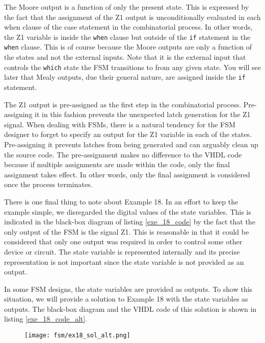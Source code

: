 \begin{my_list}
\item The Moore output is a function of only the present state. This is expressed by the fact that the assignment of the Z1 output is unconditionally evaluated in each when clause of the case statement in the combinatorial process. In other words, the Z1 variable is inside the \texttt{when} clause but outside of the \texttt{if} statement in the \texttt{when} clause. This is of course because the Moore outputs are only a function of the states and not the external inputs. Note that it is the external input that controls the \texttt{which} state the FSM transitions to from any given state. You will see later that Mealy outputs, due their general nature, are assigned inside the \texttt{if} statement.

\item The Z1 output is pre-assigned as the first step in the combinatorial process. Pre-assigning it in this fashion prevents the unexpected latch generation for the Z1 signal. When dealing with FSMs, there is a natural tendency for the FSM designer to forget to specify an output for the Z1 variable in each of the states. Pre-assigning it prevents latches from being generated and can arguably clean up the source code. The pre-assignment makes no difference to the VHDL code because if multiple assignments are made within the code, only the final assignment takes effect. In other words, only the final assignment is considered once the process terminates. 
\end{my_list}

There is one final thing to note about Example 18. In an effort to keep the example simple, we disregarded the digital values of the state variables. This is indicated in the black-box diagram of listing \ref{exe_18_code} by the fact that the only output of the FSM is the signal Z1. This is reasonable in that it could be considered that only one output was required in order to control some other device or circuit. The state variable is represented internally and its precise representation is not important since the state variable is not provided as an output. 

In some FSM designs, the state variables are provided as outputs. To show this situation, we will provide a solution to Example 18 with the state variables as outputs. The black-box diagram and the VHDL code of this solution is shown in listing \ref{exe_18_code_alt}.
\begin{figure}[!h]
    \centering
	\texttt{[image: fsm/ex18\_sol\_alt.png]}
\end{figure}

